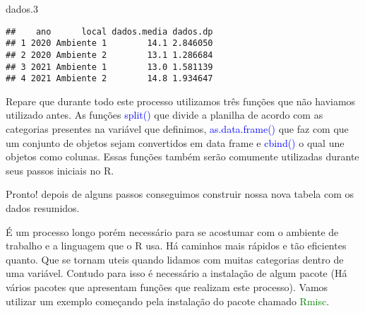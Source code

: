 \documentclass[titlepage, oneside, openany, a4paper]{book}
\newenvironment{Shaded}{\begin{snugshade}}{\end{snugshade}}
\newcommand{\FloatTok}[1]{\textcolor[rgb]{0.00,0.00,0.81}{#1}}
\newcommand{\KeywordTok}[1]{\textcolor[rgb]{0.13,0.29,0.53}{\textbf{#1}}}
\newcommand{\NormalTok}[1]{#1}
\newcommand{\OperatorTok}[1]{\textcolor[rgb]{0.81,0.36,0.00}{\textbf{#1}}}
\newcommand{\StringTok}[1]{\textcolor[rgb]{0.31,0.60,0.02}{#1}}
\begin{document}
\begin{Shaded}
\end{Shaded}

\begin{Shaded}
\begin{Highlighting}[]
\NormalTok{dados}\FloatTok{.3}
\end{Highlighting}
\end{Shaded}

\begin{verbatim}
##    ano      local dados.media dados.dp
## 1 2020 Ambiente 1        14.1 2.846050
## 2 2020 Ambiente 2        13.1 1.286684
## 3 2021 Ambiente 1        13.0 1.581139
## 4 2021 Ambiente 2        14.8 1.934647
\end{verbatim}

Repare que durante todo este processo utilizamos três funções que não haviamos utilizado antes. As funções \textcolor{blue}{split()} que divide a planilha de acordo com as categorias presentes na variável que definimos, \textcolor{blue}{as.data.frame()} que faz com que um conjunto de objetos sejam convertidos em data frame e \textcolor{blue}{cbind()} o qual une objetos como colunas. Essas funções também serão comumente utilizadas durante seus passos iniciais no R.

Pronto! depois de alguns passos conseguimos construir nossa nova tabela com os dados resumidos.

É um processo longo porém necessário para se acostumar com o ambiente de trabalho e a linguagem que o R usa. Há caminhos mais rápidos e tão eficientes quanto. Que se tornam uteis quando lidamos com muitas categorias dentro de uma variável. Contudo para isso é necessário a instalação de algum pacote (Há vários pacotes que apresentam funções que realizam este processo). Vamos utilizar um exemplo começando pela instalação do pacote chamado \textcolor{green}{Rmisc}.
\end{document}
